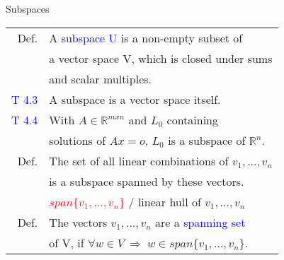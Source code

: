 \begin{mainbox}{Subspaces}
\setlength{\tabcolsep}{2pt}
\begin{tabular}{rl}
	Def. & A \textcolor{blue}{subspace U} is a non-empty subset of\\
	& a vector space V, which is closed under sums\\
	& and scalar multiples.\\
	\rule{0pt}{3ex} 
	\textcolor{blue}{T 4.3} & A subspace is a vector space itself.\\
	\rule{0pt}{3ex} 
	\textcolor{blue}{T 4.4} & With $A\in\mathbb{R}^{mxn}$ and $L_0$ containing \\
	& solutions of $Ax = o$, $L_0$ is a subspace of $\mathbb{R}^n$.\\
	\rule{0pt}{3ex} 
	Def. & The set of all linear combinations of $v_1, ..., v_n$\\
	& is a subspace spanned by these vectors.\\
	& \textcolor{red}{$span\{v_1, ..., v_n\}$} / linear hull of $v_1, ..., v_n$\\
	\rule{0pt}{3ex} 
	Def. & The vectors $v_1, ..., v_n$ are a \textcolor{blue}{spanning set}\\
	& of V, if $\forall w \in V\:\Rightarrow\;w\in span\{v_1, ..., v_n\}$.
\end{tabular}
\end{mainbox}

